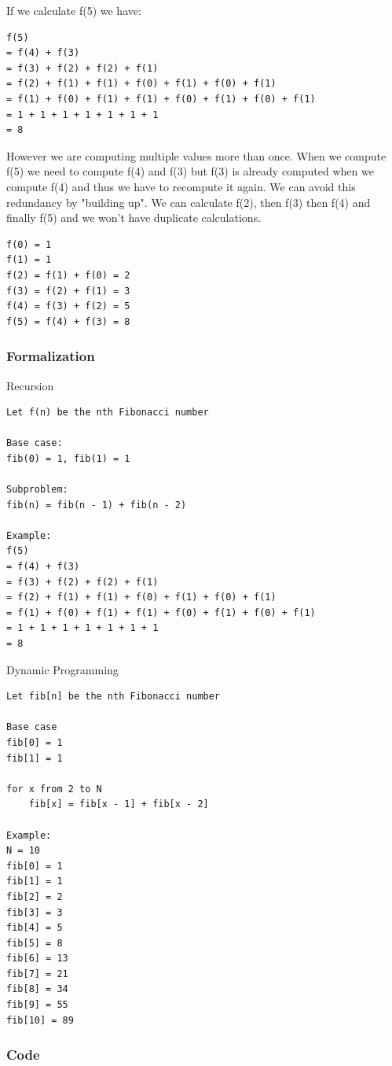 \documentclass[11pt,oneside]{book}
\begin{document}
If we calculate f(5) we have:

\begin{lstlisting}
f(5) 
= f(4) + f(3) 
= f(3) + f(2) + f(2) + f(1) 
= f(2) + f(1) + f(1) + f(0) + f(1) + f(0) + f(1) 
= f(1) + f(0) + f(1) + f(1) + f(0) + f(1) + f(0) + f(1) 
= 1 + 1 + 1 + 1 + 1 + 1 + 1
= 8
\end{lstlisting}

However we are computing multiple values more than once. When we compute f(5) we need to compute f(4) and f(3) but f(3) is already computed when we compute f(4) and thus we have to recompute it again. We can avoid this redundancy by "building up". We can calculate f(2), then f(3) then f(4) and finally f(5) and we won't have duplicate calculations.

\begin{lstlisting}
f(0) = 1
f(1) = 1
f(2) = f(1) + f(0) = 2
f(3) = f(2) + f(1) = 3
f(4) = f(3) + f(2) = 5
f(5) = f(4) + f(3) = 8
\end{lstlisting}

\subsubsection{Formalization}

Recursion

\begin{lstlisting}
Let f(n) be the nth Fibonacci number

Base case:
fib(0) = 1, fib(1) = 1

Subproblem:
fib(n) = fib(n - 1) + fib(n - 2)

Example:
f(5) 
= f(4) + f(3) 
= f(3) + f(2) + f(2) + f(1) 
= f(2) + f(1) + f(1) + f(0) + f(1) + f(0) + f(1) 
= f(1) + f(0) + f(1) + f(1) + f(0) + f(1) + f(0) + f(1) 
= 1 + 1 + 1 + 1 + 1 + 1 + 1
= 8
\end{lstlisting}

Dynamic Programming

\begin{lstlisting}
Let fib[n] be the nth Fibonacci number

Base case
fib[0] = 1
fib[1] = 1

for x from 2 to N
    fib[x] = fib[x - 1] + fib[x - 2]

Example:
N = 10
fib[0] = 1
fib[1] = 1
fib[2] = 2
fib[3] = 3
fib[4] = 5
fib[5] = 8
fib[6] = 13
fib[7] = 21
fib[8] = 34
fib[9] = 55
fib[10] = 89
\end{lstlisting}

\subsubsection{Code}
\end{document}
